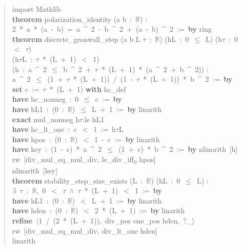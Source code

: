 \documentclass[symmetry,article,submit,moreauthors]{Definitions/mdpi}
\begin{document}
\begin{quote}\small\ttfamily\raggedright
import Mathlib\\[4pt]
\textbf{theorem} polarization\_identity (a b~:~$\mathbb{R}$) :\\
\phantom{xx}2~*~a~*~(a~-~b)~=~a~\^{}~2~-~b~\^{}~2~+~(a~-~b)~\^{}~2~:=~\textbf{by} ring\\[6pt]
\textbf{theorem} discrete\_gronwall\_step (a b L $\tau$~:~$\mathbb{R}$) (hL~:~0~$\le$~L) (h$\tau$~:~0~$<$~$\tau$)\\
\phantom{xx}(h$\tau$L~:~$\tau$~*~(L~+~1)~$<$~1)\\
\phantom{xx}(h~:~a~\^{}~2~$\le$~b~\^{}~2~+~$\tau$~*~(L~+~1)~*~(a~\^{}~2~+~b~\^{}~2)) :\\
\phantom{xx}a~\^{}~2~$\le$~(1~+~$\tau$~*~(L~+~1))~/~(1~-~$\tau$~*~(L~+~1))~*~b~\^{}~2~:=~\textbf{by}\\
\phantom{xx}\textbf{set} c~:=~$\tau$~*~(L~+~1) \textbf{with} hc\_def\\
\phantom{xx}\textbf{have} hc\_nonneg~:~0~$\le$~c~:=~\textbf{by}\\
\phantom{xxxx}\textbf{have} hL1~:~(0~:~$\mathbb{R}$)~$\le$~L~+~1~:=~\textbf{by} linarith\\
\phantom{xxxx}\textbf{exact} mul\_nonneg h$\tau$.le hL1\\
\phantom{xx}\textbf{have} hc\_lt\_one~:~c~$<$~1~:=~h$\tau$L\\
\phantom{xx}\textbf{have} hpos~:~(0~:~$\mathbb{R}$)~$<$~1~-~c~:=~\textbf{by} linarith\\
\phantom{xx}\textbf{have} key~:~(1~-~c)~*~a~\^{}~2~$\le$~(1~+~c)~*~b~\^{}~2~:=~\textbf{by} nlinarith~[h]\\
\phantom{xx}rw~[div\_mul\_eq\_mul\_div, le\_div\_iff\textsubscript{0} hpos]\\
\phantom{xx}nlinarith~[key]\\[6pt]
\textbf{theorem} stability\_step\_size\_exists (L~:~$\mathbb{R}$) (hL~:~0~$\le$~L) :\\
\phantom{xx}$\exists$~$\tau$~:~$\mathbb{R}$,~0~$<$~$\tau$~$\land$~$\tau$~*~(L~+~1)~$<$~1~:=~\textbf{by}\\
\phantom{xx}\textbf{have} hL1~:~(0~:~$\mathbb{R}$)~$<$~L~+~1~:=~\textbf{by} linarith\\
\phantom{xx}\textbf{have} hden~:~(0~:~$\mathbb{R}$)~$<$~2~*~(L~+~1)~:=~\textbf{by} linarith\\
\phantom{xx}\textbf{refine}~$\langle$1~/~(2~*~(L~+~1)),~div\_pos one\_pos hden,~?\_$\rangle$\\
\phantom{xx}rw~[div\_mul\_eq\_mul\_div, div\_lt\_one hden]\\
\phantom{xx}linarith
\end{quote}
\end{document}
